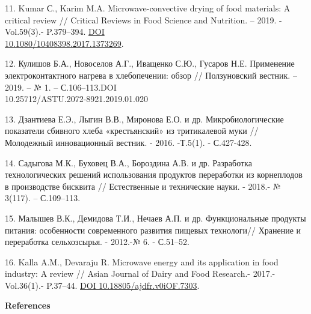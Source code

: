 \begin{references}
11. Kumar С., Karim M.A. Microwave-convective drying of food materials: A
critical review // Critical Reviews in Food Science and Nutrition. --
2019. - Vol.59(3).- P.379--394.
\href{https://doi.org/10.1080/10408398.2017.1373269}{DOI\\
10.1080/10408398.2017.1373269}.

12. Кулишов Б.А., Новоселов А.Г., Иващенко С.Ю., Гусаров Н.Е. Применение
электроконтактного нагрева в хлебопечении: обзор // Ползуновский
вестник. -- 2019. -- № 1. -- С.106--113.DOI\\
10.25712/ASTU.2072-8921.2019.01.020

13. Дзантиева Е.Э., Лыгин В.В., Миронова Е.О. и др. Микробиологические
показатели сбивного хлеба «крестьянский» из тритикалевой муки //
Молодежный инновационный вестник. - 2016. -Т.5(1). - С.427-428.

14. Садыгова М.К., Буховец В.А., Бороздина А.В. и др. Разработка
технологических решений использования продуктов переработки из
корнеплодов в производстве бисквита // Естественные и технические науки.
- 2018.- № 3(117). -- С.109--113.

15. Малышев В.К., Демидова Т.И., Нечаев А.П. и др. Функциональные
продукты питания: особенности современного развития пищевых технологи//
Хранение и переработка сельхозсырья. - 2012.-№ 6. - С.51--52.

16. Kalla A.M., Devaraju R. Microwave energy and its application in food
industry: A review // Asian Journal of Dairy and Food Research.- 2017.-
Vol.36(1).- P.37--44.
\href{https://doi.org/10.18805/ajdfr.v0iOF.7303}{DOI
10.18805/ajdfr.v0iOF.7303}.
\end{references}

\begin{center}
{\bfseries References}
\end{center}

